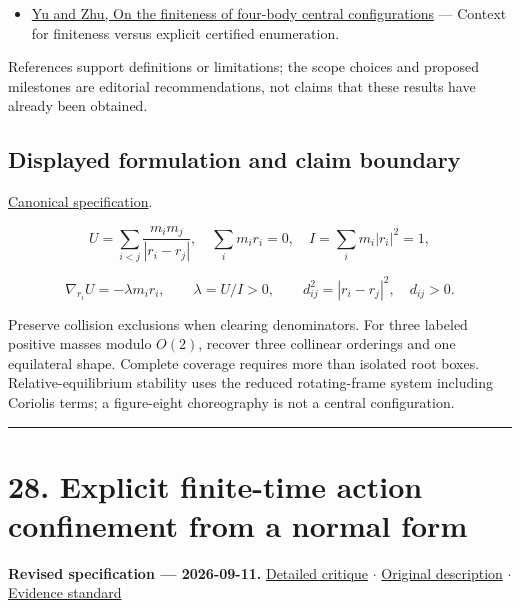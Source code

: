 \documentclass[
  11pt,
]{article}
\providecommand{\tightlist}{%
  \setlength{\itemsep}{0pt}\setlength{\parskip}{0pt}}
\begin{document}
\begin{itemize}
\tightlist
\item
  \href{https://arxiv.org/abs/2103.08906}{Yu and Zhu, On the finiteness
  of four-body central configurations} --- Context for finiteness versus
  explicit certified enumeration.
\end{itemize}

References support definitions or limitations; the scope choices and
proposed milestones are editorial recommendations, not claims that these
results have already been obtained.

\subsection{Displayed formulation and claim boundary}

\href{https://github.com/rick-stevens-ai/Pure-Thought/blob/main/PRDs/27-N-Body-Central-Configurations.md}{Canonical
specification}.

\[U=\sum_{i<j}\frac{m_im_j}{|r_i-r_j|},\quad
\sum_i m_i r_i=0,\quad I=\sum_i m_i|r_i|^2=1,\]

\[\nabla_{r_i}U=-\lambda m_i r_i,\qquad\lambda=U/I>0,
\qquad d_{ij}^2=|r_i-r_j|^2,\quad d_{ij}>0.\]

Preserve collision exclusions when clearing denominators. For three
labeled positive masses modulo \(O(2)\), recover three collinear
orderings and one equilateral shape. Complete coverage requires more
than isolated root boxes. Relative-equilibrium stability uses the
reduced rotating-frame system including Coriolis terms; a figure-eight
choreography is not a central configuration.

\begin{center}\rule{0.5\linewidth}{0.5pt}\end{center}

\section{28. Explicit finite-time action confinement from a normal form}

\textbf{Revised specification --- 2026-09-11.}
\href{https://github.com/rick-stevens-ai/Pure-Thought/blob/main/reviews/28-Nekhoroshev-Stability-Theory.md}{Detailed
critique} \ensuremath{\cdot}
\href{https://github.com/rick-stevens-ai/Pure-Thought/blob/main/archive/original-PRDs/28-Nekhoroshev-Stability-Theory.md}{Original
description} \ensuremath{\cdot}
\href{https://github.com/rick-stevens-ai/Pure-Thought/blob/main/reviews/EVIDENCE-STANDARD.md}{Evidence
standard}
\end{document}
